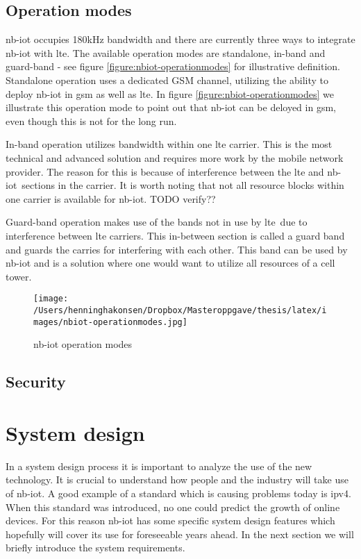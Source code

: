 \documentclass[USenglish]{ifimaster}  %
\begin{document}
\subsection{Operation modes}
\acrshort{nb-iot} occupies 180kHz bandwidth and there are currently three ways to integrate \acrshort{nb-iot} with \acrshort{lte}. The available operation modes are standalone, in-band and guard-band - see figure \vref{figure:nbiot-operationmodes} for illustrative definition. Standalone operation uses a dedicated GSM channel, utilizing the ability to deploy \acrshort{nb-iot} in \acrshort{gsm} as well as \acrshort{lte}. In figure \vref{figure:nbiot-operationmodes} we illustrate this operation mode to point out that \acrshort{nb-iot} can be deloyed in \acrshort{gsm}, even though this is not for the long run.

In-band operation utilizes bandwidth within one \acrshort{lte} carrier. This is the most technical and advanced solution and requires more work by the mobile network provider. The reason for this is because of interference between the \acrshort{lte} and \acrshort{nb-iot} sections in the carrier. It is worth noting that not all resource blocks within one carrier is available for \acrshort{nb-iot}. TODO verify??

Guard-band operation makes use of the bands not in use by \acrshort{lte} due to interference between \acrshort{lte} carriers. This in-between section is called a guard band and guards the carries for interfering with each other. This band can be used by \acrshort{nb-iot} and is a solution where one would want to utilize all resources of a cell tower.

\begin{figure}[ht]
  \centering\texttt{[image: /Users/henninghakonsen/Dropbox/Masteroppgave/thesis/latex/images/nbiot-operationmodes.jpg]}
  \caption{\acrshort{nb-iot} operation modes \cite{online:legacyWire}}
  \label{figure:nbiot-operationmodes}
\end{figure}

\subsection{Security} \label{ssection:nb-iot-security}


\section{System design} %
In a system design process it is important to analyze the use of the new technology. It is crucial to understand how people and the industry will take use of \acrshort{nb-iot}. A good example of a standard which is causing problems today is \acrshort{ipv4}. When this standard was introduced, no one could predict the growth of online devices. For this reason \acrshort{nb-iot} has some specific system design features which hopefully will cover its use for foreseeable years ahead. In the next section we will briefly introduce the system requirements.
\end{document}
